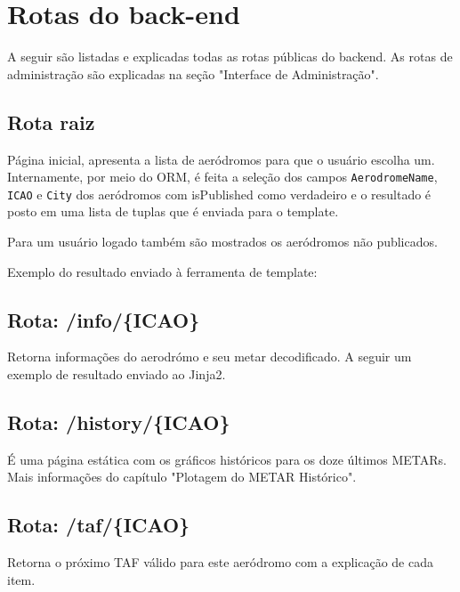 \chapter{Rotas do back-end}

A seguir são listadas e explicadas todas as rotas públicas do backend. As
rotas de administração são explicadas na seção "Interface de Administração".

\section{Rota raiz}

Página inicial, apresenta a lista de aeródromos para que o usuário escolha um. 
Internamente, por meio do ORM, é feita a seleção dos campos \texttt{AerodromeName},
\texttt{ICAO} e \texttt{City} dos aeródromos com isPublished como verdadeiro e o
 resultado é posto em uma lista de tuplas que é enviada para o template.

Para um usuário logado também são mostrados os aeródromos não publicados.

Exemplo do resultado enviado à ferramenta de template:




\section{Rota: /info/\{ICAO\}}

Retorna informações do aerodrómo e seu metar decodificado. A seguir um exemplo
de resultado enviado ao Jinja2.




\section{Rota: /history/\{ICAO\}}
É uma página estática com os gráficos históricos para os doze últimos METARs.
Mais informações do capítulo "Plotagem do METAR Histórico".


\section{Rota: /taf/\{ICAO\}}
Retorna o próximo TAF válido para este aeródromo com a explicação de cada item.

